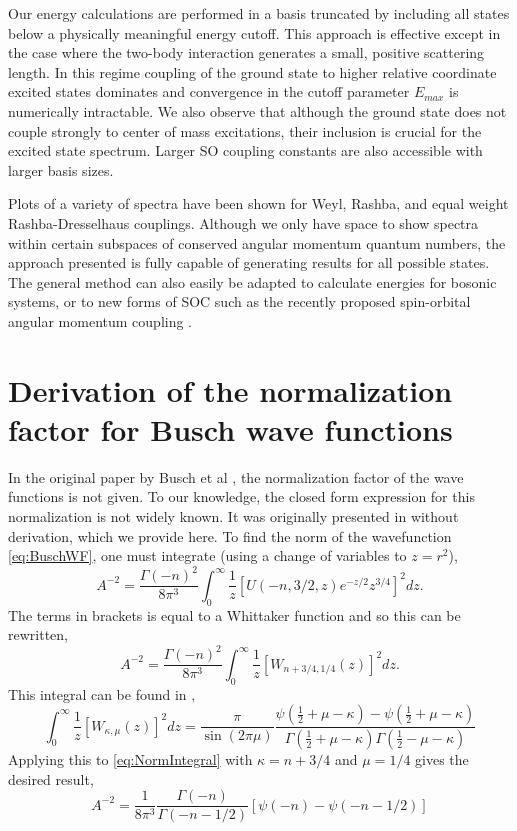 \documentclass[%
 preprint,
 amsmath,amssymb,
 aps,
]{revtex4-1}
\begin{document}
Our energy calculations are performed in a basis truncated by including all states below a physically meaningful energy cutoff. This approach is effective except in the case where the two-body interaction generates a small, positive scattering length. In this regime coupling of the ground state to higher relative coordinate excited states dominates and convergence in the cutoff parameter $E_{max}$ is numerically intractable. We also observe that although the ground state does not couple strongly to center of mass excitations, their inclusion is crucial for the excited state spectrum. Larger SO coupling constants are also accessible with larger basis sizes.

Plots of a variety of spectra have been shown for Weyl, Rashba, and equal weight Rashba-Dresselhaus couplings. Although we only have space to show spectra within certain subspaces of conserved angular momentum quantum numbers, the approach presented is fully capable of generating results for all possible states. The general method can also easily be adapted to calculate energies for bosonic systems, or to new forms of SOC such as the recently proposed spin-orbital angular momentum coupling \cite{2014arXiv1411.1737S}.




\appendix*
\section{Derivation of the normalization factor for Busch wave functions}
In the original paper by Busch et al \cite{Busch}, the normalization factor of the wave functions is not given. To our knowledge, the closed form expression for this normalization is not widely known. It was originally presented in \cite{PhysRevA.85.053614} without derivation, which we provide here. To find the norm of the wavefunction \eqref{eq:BuschWF}, one must integrate (using a change of variables to $z=r^2$),
\begin{equation}\label{eq:NormIntegral}
A^{-2}=\frac{\Gamma(-n)^2}{8\pi^3}  \int_0^\infty \frac{1}{z}\left[U(-n,3/2,z)e^{-z/2} z^{3/4} \right]^2  dz.
\end{equation}
The terms in brackets is equal to a Whittaker function \cite{DLMF} and so this can be rewritten,
\begin{equation}
A^{-2}=\frac{\Gamma(-n)^2}{8\pi^3}  \int_0^\infty \frac{1}{z}\left[W_{n+3/4,1/4}(z) \right]^2  dz.
\end{equation}
This integral can be found in \cite{GradshteynRyzhik},
\begin{equation}
\int_0^\infty \frac{1}{z}\left[W_{\kappa,\mu}(z) \right]^2  dz=\frac{\pi}{\sin (2\pi \mu)}\frac{\psi(\frac{1}{2}+\mu-\kappa)-\psi(\frac{1}{2}+\mu-\kappa)}{\Gamma(\frac{1}{2}+\mu-\kappa)\Gamma(\frac{1}{2}-\mu-\kappa)}
\end{equation}
Applying this to \eqref{eq:NormIntegral} with $\kappa=n+3/4$ and $\mu=1/4$ gives the desired result,
\begin{equation}
A^{-2}=\frac{1}{8\pi^3}  \frac{\Gamma (-n)}{\Gamma(-n-1/2)}\left[\psi(-n)-\psi(-n-1/2)\right]
\end{equation}
\end{document}
